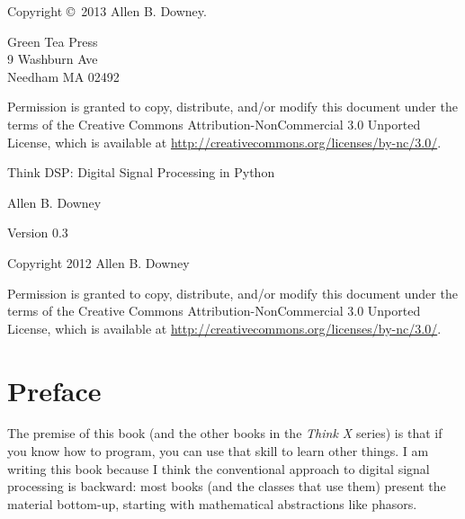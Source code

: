 \documentclass[12pt]{book}
\newcommand{\thetitle}{Think DSP: Digital Signal Processing in Python}
\newcommand{\theversion}{0.3}
\begin{document}
\begin{latexonly}
Copyright \copyright ~2013 Allen B. Downey.


\vspace{0.2in}

\begin{flushleft}
Green Tea Press       \\
9 Washburn Ave \\
Needham MA 02492
\end{flushleft}

Permission is granted to copy, distribute, and/or modify this document
under the terms of the Creative Commons Attribution-NonCommercial 3.0 Unported
License, which is available at \url{http://creativecommons.org/licenses/by-nc/3.0/}.

\vspace{0.2in}

\end{latexonly}



\begin{htmlonly}


{\Large \thetitle}

{\large Allen B. Downey}

Version \theversion

\vspace{0.25in}

Copyright 2012 Allen B. Downey

\vspace{0.25in}

Permission is granted to copy, distribute, and/or modify this document
under the terms of the Creative Commons Attribution-NonCommercial 3.0
Unported License, which is available at
\url{http://creativecommons.org/licenses/by-nc/3.0/}.

\setcounter{chapter}{-1}

\end{htmlonly}

\fi

\chapter{Preface}
\label{preface}

The premise of this book (and the other books in the {\it Think X}
series) is that if you know how to program, you can use that skill to
learn other things.  I am writing this book because I think the
conventional approach to digital signal processing is backward: most
books (and the classes that use them) present the material bottom-up,
starting with mathematical abstractions like phasors.
\end{document}
